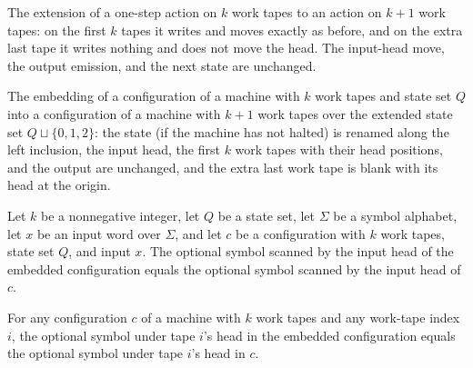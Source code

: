 \begin{definition}
\label{Turing.Action.extend}
\leanok
{}
The extension of a one-step action on $k$ work tapes to an action on $k+1$
work tapes: on the first $k$ tapes it writes and moves exactly as before, and
on the extra last tape it writes nothing and does not move the head.  The
input-head move, the output emission, and the next state are unchanged.
\end{definition}

\begin{definition}
\label{Turing.Cfg.embedOracle}
\leanok
{}
The embedding of a configuration of a machine with $k$ work tapes and state
set $Q$ into a configuration of a machine with $k+1$ work tapes over the
extended state set $Q \sqcup \{0,1,2\}$: the state (if the machine has not
halted) is renamed along the left inclusion, the input head, the first $k$
work tapes with their head positions, and the output are unchanged, and the
extra last work tape is blank with its head at the origin.
\end{definition}

\begin{lemma}
\label{Turing.Cfg.embedOracle_inputSymbol}
\leanok
{}
Let $k$ be a nonnegative integer, let $Q$ be a state set, let $\Sigma$ be a symbol
alphabet, let $x$ be an input word over $\Sigma$, and let $c$ be a configuration with
$k$ work tapes, state set $Q$, and input $x$. The optional symbol scanned by the input
head of the embedded configuration equals the optional symbol scanned by the input head
of $c$.
\end{lemma}

\begin{lemma}
\label{Turing.Cfg.embedOracle_workTapeSymbols}
\leanok
{}
For any configuration $c$ of a machine with $k$ work tapes and any work-tape index $i$,
the optional symbol under tape $i$'s head in the embedded configuration equals the
optional symbol under tape $i$'s head in $c$.
\end{lemma}

